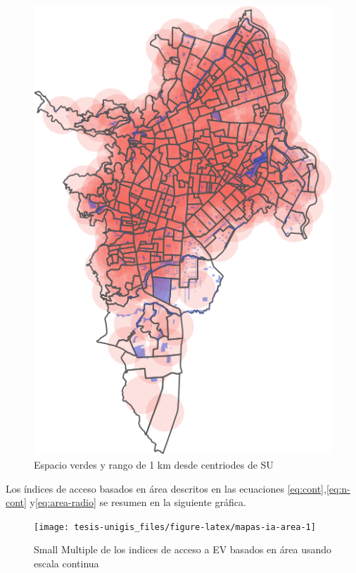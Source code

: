 \documentclass[12pt,]{book}
\begin{document}
\begin{figure}
\includegraphics[width=1\linewidth]{tesis-unigis_files/figure-latex/mapa-rango1km-1} \caption{Espacio verdes y rango de 1 km desde centriodes de SU}\label{fig:mapa-rango1km}
\end{figure}

Los índices de acceso basados en área descritos en las ecuaciones
\eqref{eq:cont},\eqref{eq:n-cont} y\eqref{eq:area-radio} se resumen en la
siguiente gráfica.

\begin{figure}
\texttt{[image: tesis-unigis\_files/figure-latex/mapas-ia-area-1]} \caption{Small Multiple de los indices de acceso a EV basados en área usando escala continua}\label{fig:mapas-ia-area}
\end{figure}
\end{document}
